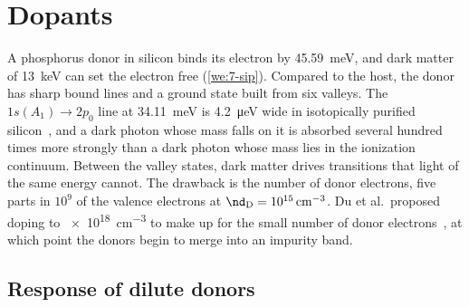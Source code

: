 \section{Dopants}\label{sec:16.5}

A phosphorus donor in silicon binds its electron by \SI{45.59}{meV}, and dark matter of \SI{13}{keV} can set the electron free (\cref{we:7-sip}). Compared to the host, the donor has sharp bound lines and a ground state built from six valleys. The $1s(A_1) \to 2p_0$ line at \SI{34.11}{meV} is \SI{4.2}{\micro eV} wide in isotopically purified silicon~\cite[p.~5]{vinh2008silicon}, and a dark photon whose mass falls on it is absorbed several hundred times more strongly than a dark photon whose mass lies in the ionization continuum. Between the valley states, dark matter drives transitions that light of the same energy cannot. The drawback is the number of donor electrons, five parts in $10^9$ of the valence electrons at $\nd_{\mathrm{D}} = \SI{e15}{cm^{-3}}$. Du et al.\ proposed doping to \SI{e18}{cm^{-3}} to make up for the small number of donor electrons~\cite{du2022doped}, at which point the donors begin to merge into an impurity band.

\subsection{Response of dilute donors}\label{sec:16.5-response}

